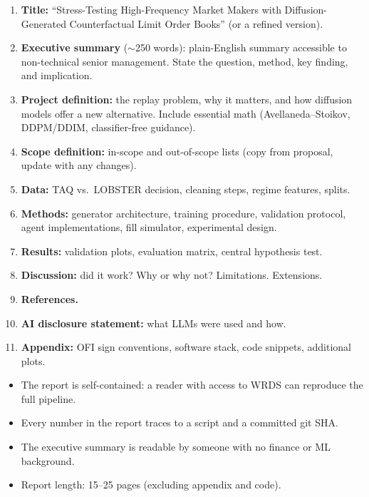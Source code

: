 \documentclass[11pt,a4paper]{article}
\begin{document}
\begin{enumerate}[nosep]
  \item \textbf{Title:} ``Stress-Testing High-Frequency Market Makers with Diffusion-Generated Counterfactual Limit Order Books'' (or a refined version).
  \item \textbf{Executive summary} ($\sim$250 words): plain-English summary accessible to non-technical senior management.  State the question, method, key finding, and implication.
  \item \textbf{Project definition:} the replay problem, why it matters, and how diffusion models offer a new alternative.  Include essential math (Avellaneda--Stoikov, DDPM/DDIM, classifier-free guidance).
  \item \textbf{Scope definition:} in-scope and out-of-scope lists (copy from proposal, update with any changes).
  \item \textbf{Data:} TAQ vs.\ LOBSTER decision, cleaning steps, regime features, splits.
  \item \textbf{Methods:} generator architecture, training procedure, validation protocol, agent implementations, fill simulator, experimental design.
  \item \textbf{Results:} validation plots, evaluation matrix, central hypothesis test.
  \item \textbf{Discussion:} did it work?  Why or why not?  Limitations.  Extensions.
  \item \textbf{References.}
  \item \textbf{AI disclosure statement:} what LLMs were used and how.
  \item \textbf{Appendix:} OFI sign conventions, software stack, code snippets, additional plots.
\end{enumerate}

\begin{successbox}
  \begin{itemize}[nosep]
    \item The report is self-contained: a reader with access to WRDS can reproduce the full pipeline.
    \item Every number in the report traces to a script and a committed git SHA.
    \item The executive summary is readable by someone with no finance or ML background.
    \item Report length: 15--25 pages (excluding appendix and code).
  \end{itemize}
\end{successbox}
\end{document}
